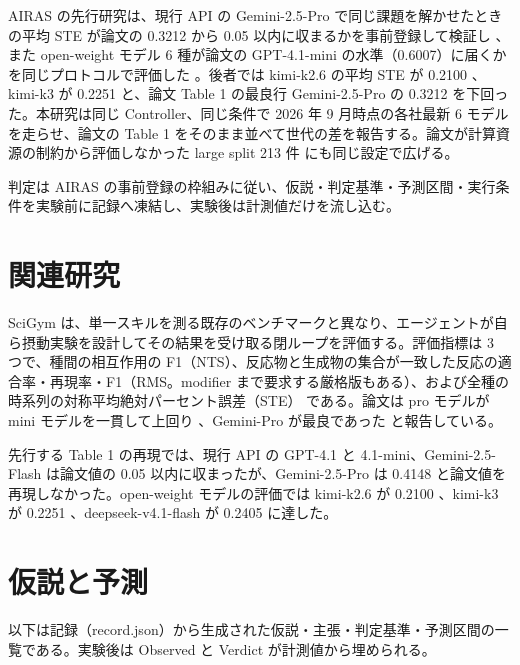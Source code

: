 \documentclass{article}
\providecommand{\unverified}[1]{#1}
\begin{document}
AIRAS の先行研究は、現行 API の Gemini-2.5-Pro で同じ課題を解かせたときの平均 STE が論文の 0.3212 から 0.05 以内に収まるかを事前登録して検証し \cite[s3.p1]{scigymtable1reproduction-2026-scigym}、また open-weight モデル 6 種が論文の GPT-4.1-mini の水準（0.6007）に届くかを同じプロトコルで評価した \cite[s4.p1]{scigymrikyuopenmodels-2026-scigym}。後者では kimi-k2.6 の平均 STE が \unverified{0.2100} \cite[s4.p2]{scigymrikyuopenmodels-2026-scigym}、kimi-k3 が \unverified{0.2251} \cite[s4.p3]{scigymrikyuopenmodels-2026-scigym} と、論文 Table 1 の最良行 Gemini-2.5-Pro の \unverified{0.3212} \cite[s1.p5]{duan-2025-measuring} を下回った。本研究は同じ Controller、同じ条件で 2026 年 9 月時点の各社最新 6 モデルを走らせ、論文の Table 1 をそのまま並べて世代の差を報告する。論文が計算資源の制約から評価しなかった large split 213 件 \cite[s1.p2]{duan-2025-measuring} にも同じ設定で広げる。

判定は AIRAS の事前登録の枠組みに従い、仮説・判定基準・予測区間・実行条件を実験前に記録へ凍結し、実験後は計測値だけを流し込む。

\section{関連研究}
\label{sec:related}
SciGym \citep{duan-2025-measuring} は、単一スキルを測る既存のベンチマークと異なり、エージェントが自ら摂動実験を設計してその結果を受け取る閉ループを評価する。評価指標は 3 つで、種間の相互作用の F1（NTS）、反応物と生成物の集合が一致した反応の適合率・再現率・F1（RMS。modifier まで要求する厳格版もある）\cite[s1.p8]{duan-2025-measuring}、および全種の時系列の対称平均絶対パーセント誤差（STE）\cite[s1.p9]{duan-2025-measuring} である。論文は pro モデルが mini モデルを一貫して上回り \cite[s1.p6]{duan-2025-measuring}、Gemini-Pro が最良であった \cite[s1.p7]{duan-2025-measuring} と報告している。

先行する Table 1 の再現では、現行 API の GPT-4.1 と 4.1-mini、Gemini-2.5-Flash は論文値の 0.05 以内に収まったが、Gemini-2.5-Pro は \unverified{0.4148} \cite[s3.p2]{scigymtable1reproduction-2026-scigym} と論文値を再現しなかった。open-weight モデルの評価では kimi-k2.6 が \unverified{0.2100} \cite[s4.p2]{scigymrikyuopenmodels-2026-scigym}、kimi-k3 が \unverified{0.2251} \cite[s4.p3]{scigymrikyuopenmodels-2026-scigym}、deepseek-v4.1-flash が \unverified{0.2405} \cite[s4.p4]{scigymrikyuopenmodels-2026-scigym} に達した。

\section{仮説と予測}
\label{sec:hypothesis}
以下は記録（record.json）から生成された仮説・主張・判定基準・予測区間の一覧である。実験後は Observed と Verdict が計測値から埋められる。
\end{document}

